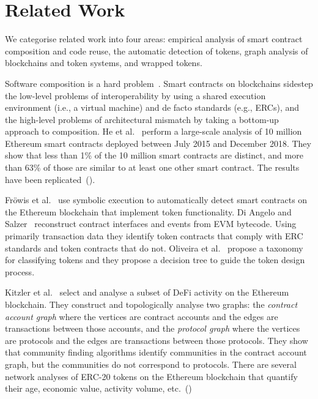 \section{Related Work}\label{sec:related-work}

We categorise related work into four areas: empirical analysis of
smart contract composition and code reuse, the automatic detection of
tokens, graph analysis of blockchains and token systems, and wrapped
tokens.

Software composition is a hard problem~\cite{garlan-et-al-94}.  Smart
contracts on blockchains sidestep the low-level problems of
interoperability by using a shared execution environment (i.e., a
virtual machine) and de facto standards (e.g., ERCs), and the
high-level problems of architectural mismatch by taking a bottom-up
approach to composition.  He et al.~\cite{he-et-al-20} perform a
large-scale analysis of \num{10} million Ethereum smart contracts
deployed between July 2015 and December 2018.  They show that less
than \num{1}\% of the \num{10} million smart contracts are distinct,
and more than \num{63}\% of those are similar to at least one other
smart contract.  The results have been
replicated~(\hspace{1sp}\cite{kondo-et-al-20,chen-et-al-21,khan-et-al-22}).

Fr\"owis et al.~\cite{frowis-et-al-19} use symbolic execution to
automatically detect smart contracts on the Ethereum blockchain that
implement token functionality.  Di Angelo and
Salzer~\cite{di-angelo-salzer-21} reconstruct contract interfaces and
events from EVM bytecode.  Using primarily transaction data they
identify token contracts that comply with ERC standards and token
contracts that do not.  Oliveira et al.~\cite{oliveira-et-al-18}
propose a taxonomy for classifying tokens and they propose a decision
tree to guide the token design process.

Kitzler et al.~\cite{kitzler-et-al-21} select and analyse a subset of
DeFi activity on the Ethereum blockchain.  They construct and
topologically analyse two graphs: the \textit{contract account graph}
where the vertices are contract accounts and the edges are
transactions between those accounts, and the \textit{protocol graph}
where the vertices are protocols and the edges are transactions
between those protocols.  They show that community finding algorithms
identify communities in the contract account graph, but the
communities do not correspond to protocols.  There are several network
analyses of ERC-20 tokens on the Ethereum blockchain that quantify
their age, economic value, activity volume,
etc.~(\hspace{1sp}\cite{somin-et-al-18,victor-luders-19})

